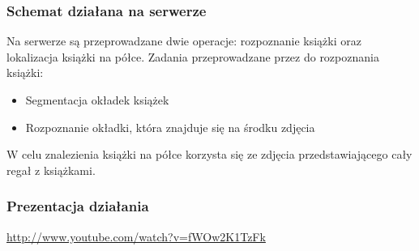 \begin{frame}
    \frametitle{Schemat działana na serwerze}
    Na serwerze są przeprowadzane dwie operacje: rozpoznanie książki oraz lokalizacja książki na półce.
    Zadania przeprowadzane przez do rozpoznania książki:
    \begin{itemize}
        \item Segmentacja okładek książek
        \item Rozpoznanie okładki, która znajduje się na środku zdjęcia
    \end{itemize}

    W celu znalezienia książki na półce korzysta się ze zdjęcia przedstawiającego cały regał z książkami.
\end{frame}

\begin{frame}
    \frametitle{Prezentacja działania}
        \url{http://www.youtube.com/watch?v=fWOw2K1TzFk}
\end{frame}

